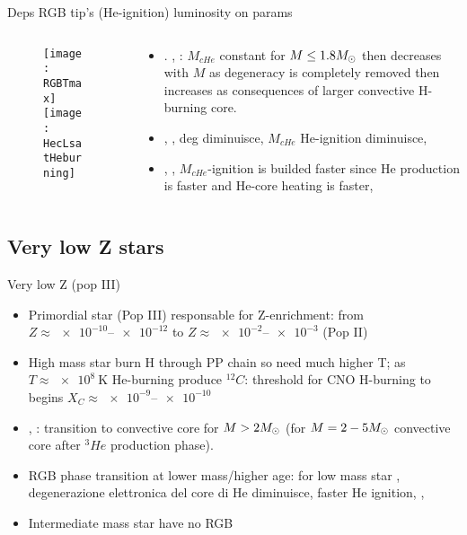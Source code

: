 \begin{frame}{Deps RGB tip's (He-ignition) luminosity on params}
\begin{columns}[T]\begin{column}{0.44\textwidth}
\begin{figure}[!ht]
\texttt{[image: RGBTmax]}\label{fig:RGBTmax}
\texttt{[image: HecLsatHeburning]}\label{fig:HecLsatHeburning}
\end{figure}
\end{column}
\begin{column}{0.55\textwidth}
\begin{itemize}
    \item {}. , : $M_{cHe}$ constant for $M\leq1.8M_{\odot}{}$ then decreases with $M$ as degeneracy is completely removed then increases as consequences of larger convective H-burning core.
    \item {}, , deg \Pelectron diminuisce, $M_{cHe}$ He-ignition diminuisce, 
    \item {}, , $M_{cHe}$-ignition is builded faster since He production is faster and He-core heating is faster, 
\end{itemize}
\end{column}\end{columns}
\end{frame}

\subsection{Very low Z stars}

\begin{frame}{Very low Z (pop III)}
\begin{itemize}
    \item Primordial star (Pop III) responsable for Z-enrichment: from $Z\approx\numrange{e-10}{e-12}$ to $Z\approx\numrange{e-2}{e-3}$ (Pop II)
    \item High mass star burn H through PP chain so need much higher T; as $T\approx\SI{e8}{\kelvin}$ He-burning produce $^{12}C$: threshold for CNO H-burning to begins $X_C\approx\numrange{e-9}{e-10}$
    \item {}, : transition to convective core for $M>2M_{\odot}{}$ (for $M=2-5M_{\odot}{}$ convective core after $^3He$ production phase).
    \item RGB phase transition at lower mass/higher age: for low mass star , degenerazione elettronica del core di He diminuisce, faster He ignition, , 
    \item Intermediate mass star have no RGB
\end{itemize}
\end{frame}


